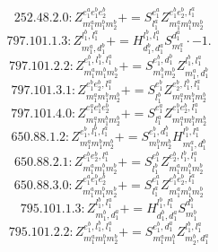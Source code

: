 \documentclass[letterpaper,10pt,fleqn,leqno,onecolumn]{article}
\begin{document}
\begin{equation} \;\;\;\;\;\;  252.48.2.0: Z^{e_{1}^{a}e_{1}^{b}e_{2}^{b}}_{m_{1}^{a}m_{1}^{b}m_{2}^{b}}+=S^{e_{1}^{a}}_{l_{1}^{a}}Z^{e_{1}^{b}e_{2}^{b},l_{1}^{a}}_{m_{1}^{a}m_{1}^{b}m_{2}^{b}} \end{equation}
\begin{equation} \;\;\;\;\;\;  797.101.1.3: Z^{l_{1}^{b},l_{1}^{a}}_{m_{1}^{a},d_{1}^{b}}+=H^{l_{1}^{b},l_{1}^{a}}_{d_{1}^{b},d_{1}^{a}}S^{d_{1}^{a}}_{m_{1}^{a}}\cdot -1. \end{equation}
\begin{equation} \;\;\;\;\;\;  797.101.2.2: Z^{e_{1}^{b},l_{1}^{b},l_{1}^{a}}_{m_{1}^{a}m_{1}^{b}m_{2}^{b}}+=S^{e_{1}^{b},d_{1}^{b}}_{m_{1}^{b}m_{2}^{b}}Z^{l_{1}^{b},l_{1}^{a}}_{m_{1}^{a},d_{1}^{b}} \end{equation}
\begin{equation} \;\;\;\;\;\;  797.101.3.1: Z^{e_{1}^{b}e_{2}^{b},l_{1}^{a}}_{m_{1}^{a}m_{1}^{b}m_{2}^{b}}+=S^{e_{1}^{b}}_{l_{1}^{b}}Z^{e_{2}^{b},l_{1}^{b},l_{1}^{a}}_{m_{1}^{a}m_{1}^{b}m_{2}^{b}} \end{equation}
\begin{equation} \;\;\;\;\;\;  797.101.4.0: Z^{e_{1}^{a}e_{1}^{b}e_{2}^{b}}_{m_{1}^{a}m_{1}^{b}m_{2}^{b}}+=S^{e_{1}^{a}}_{l_{1}^{a}}Z^{e_{1}^{b}e_{2}^{b},l_{1}^{a}}_{m_{1}^{a}m_{1}^{b}m_{2}^{b}} \end{equation}
\begin{equation} \;\;\;\;\;\;  650.88.1.2: Z^{e_{1}^{b},l_{1}^{b},l_{1}^{a}}_{m_{1}^{a}m_{1}^{b}m_{2}^{b}}+=S^{e_{1}^{b},d_{1}^{b}}_{m_{1}^{b}m_{2}^{b}}H^{l_{1}^{b},l_{1}^{a}}_{m_{1}^{a},d_{1}^{b}} \end{equation}
\begin{equation} \;\;\;\;\;\;  650.88.2.1: Z^{e_{1}^{b}e_{2}^{b},l_{1}^{a}}_{m_{1}^{a}m_{1}^{b}m_{2}^{b}}+=S^{e_{1}^{b}}_{l_{1}^{b}}Z^{e_{2}^{b},l_{1}^{b},l_{1}^{a}}_{m_{1}^{a}m_{1}^{b}m_{2}^{b}} \end{equation}
\begin{equation} \;\;\;\;\;\;  650.88.3.0: Z^{e_{1}^{a}e_{1}^{b}e_{2}^{b}}_{m_{1}^{a}m_{1}^{b}m_{2}^{b}}+=S^{e_{1}^{a}}_{l_{1}^{a}}Z^{e_{1}^{b}e_{2}^{b},l_{1}^{a}}_{m_{1}^{a}m_{1}^{b}m_{2}^{b}} \end{equation}
\begin{equation} \;\;\;\;\;\;  795.101.1.3: Z^{l_{1}^{b},l_{1}^{a}}_{m_{1}^{b},d_{1}^{a}}+=H^{l_{1}^{b},l_{1}^{a}}_{d_{1}^{b},d_{1}^{a}}S^{d_{1}^{b}}_{m_{1}^{b}} \end{equation}
\begin{equation} \;\;\;\;\;\;  795.101.2.2: Z^{e_{1}^{b},l_{1}^{b},l_{1}^{a}}_{m_{1}^{a}m_{1}^{b}m_{2}^{b}}+=S^{e_{1}^{b},d_{1}^{a}}_{m_{1}^{a}m_{1}^{b}}Z^{l_{1}^{b},l_{1}^{a}}_{m_{2}^{b},d_{1}^{a}} \end{equation}
\end{document}
